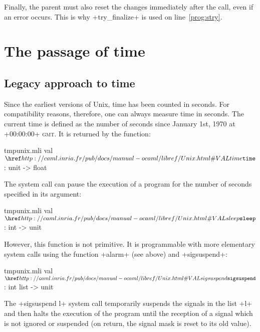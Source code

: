 \begin{example}
Finally, the parent must also reset the changes immediately after the
call, even if an error occurs. This is why
\ml+try_finalize+ is used on line~\ref{prog:stry}.
\end{example}


\section{The passage of time}

\subsection*{Legacy approach to time}

Since the earliest versions of Unix, time has been counted in seconds.
For compatibility reasons, therefore, one can always measure time in seconds.
The current time is defined as the number of seconds since January 1st, 1970
at \ml+00:00:00+ \textsc{gmt}.  It is returned by the function:

%
\begin{listingcodefile}{tmpunix.mli}
val $\indexlibvalue{Unix}{time}$ : unit -> float
\end{listingcodefile}
%

The  system call can pause the execution of a program
for the number of seconds specified in its argument:
%
\begin{listingcodefile}{tmpunix.mli}
val $\libvalue{Unix}{sleep}$ : int -> unit
\end{listingcodefile}
%

However, this function is not primitive. It is programmable with 
more elementary system calls using the function \ml+alarm+ (see 
above) and \ml+sigsuspend+: 

%
\begin{listingcodefile}{tmpunix.mli}
val $\libvalue{Unix}{sigsuspend}$ : int list -> unit
\end{listingcodefile}
%

The \ml+sigsuspend l+ system call temporarily suspends the signals in the 
list \ml+l+ and then halts the execution of the program until the reception 
of a signal which is not ignored or suspended (on return, the 
signal mask is reset to its old value).

